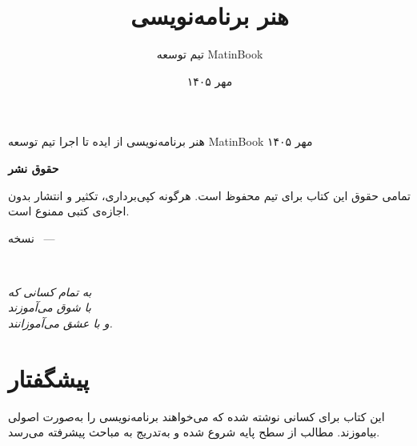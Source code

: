 \documentclass{matinbook}
\title{هنر برنامه‌نویسی}
\author{تیم توسعه MatinBook}
\date{مهر ۱۴۰۵}
\begin{document}
\makecover
    {هنر برنامه‌نویسی}
    {از ایده تا اجرا}
    {تیم توسعه MatinBook}
    {مهر ۱۴۰۵}

\frontmatter
\frontmattergeometry

\maketitle

\thispagestyle{empty}
\vfill
\begin{center}
    {\large\textbf{حقوق نشر}}

    \vspace{1cm}

    تمامی حقوق این کتاب برای تیم  محفوظ است.
    هرگونه کپی‌برداری، تکثیر و انتشار بدون اجازه‌ی کتبی
    ممنوع است.

    \vspace{1cm}

    نسخه \matinbookversion\ — \matinbookdate

    \vspace{1cm}

     \\
\end{center}
\clearpage

\thispagestyle{empty}
\vfill
\begin{flushright}
    {\Large\itshape
        به تمام کسانی که\\
        با شوق می‌آموزند\\
        و با عشق می‌آموزانند.
    }
\end{flushright}
\clearpage

\chapter*{پیشگفتار}

این کتاب برای کسانی نوشته شده که می‌خواهند
برنامه‌نویسی را به‌صورت اصولی بیاموزند. مطالب از
سطح پایه شروع شده و به‌تدریج به مباحث پیشرفته
می‌رسد.
\end{document}
